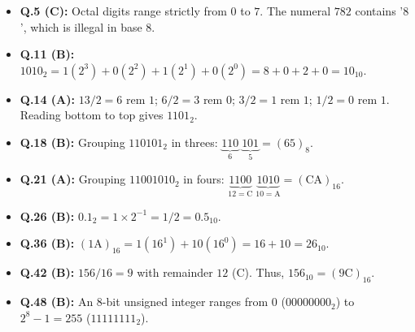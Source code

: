 \begin{expbox}
\begin{itemize}[leftmargin=5mm]
    \item \textbf{Q.5 (C):} Octal digits range strictly from $0$ to $7$. The numeral $782$ contains '$8$', which is illegal in base 8.
    \item \textbf{Q.11 (B):} $1010_2 = 1(2^3) + 0(2^2) + 1(2^1) + 0(2^0) = 8 + 0 + 2 + 0 = 10_{10}$.
    \item \textbf{Q.14 (A):} $13 / 2 = 6$ rem $1$; $6/2 = 3$ rem $0$; $3/2 = 1$ rem $1$; $1/2 = 0$ rem $1$. Reading bottom to top gives $1101_2$.
    \item \textbf{Q.18 (B):} Grouping $110101_2$ in threes: $\underbrace{110}_{6}\;\underbrace{101}_{5} = (65)_8$.
    \item \textbf{Q.21 (A):} Grouping $11001010_2$ in fours: $\underbrace{1100}_{12=\text{C}}\;\underbrace{1010}_{10=\text{A}} = (\text{CA})_{16}$.
    \item \textbf{Q.26 (B):} $0.1_2 = 1 \times 2^{-1} = 1/2 = 0.5_{10}$.
    \item \textbf{Q.36 (B):} $(1\text{A})_{16} = 1(16^1) + 10(16^0) = 16 + 10 = 26_{10}$.
    \item \textbf{Q.42 (B):} $156 / 16 = 9$ with remainder $12$ ($\text{C}$). Thus, $156_{10} = (9\text{C})_{16}$.
    \item \textbf{Q.48 (B):} An 8-bit unsigned integer ranges from $0$ ($00000000_2$) to $2^8 - 1 = 255$ ($11111111_2$).
\end{itemize}
\end{expbox}

\newpage
